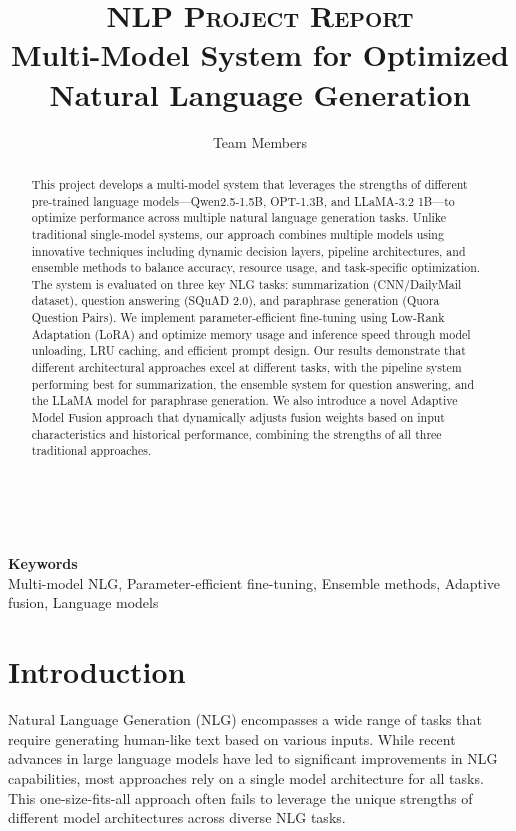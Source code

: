 \documentclass[10pt,twocolumn,letterpaper]{article}
\title{
    \usefont{OT1}{bch}{b}{n}
    \normalfont \normalsize \textsc{NLP Project Report} \\ [10pt]
    \huge Multi-Model System for Optimized Natural Language Generation \\
}
\author[1]{Team Members}
\affil[1]{\small{Department of Computer Science, IIT Delhi}}
\begin{document}
\maketitle

\begin{abstract}
This project develops a multi-model system that leverages the strengths of different pre-trained language models—Qwen2.5-1.5B, OPT-1.3B, and LLaMA-3.2 1B—to optimize performance across multiple natural language generation tasks. Unlike traditional single-model systems, our approach combines multiple models using innovative techniques including dynamic decision layers, pipeline architectures, and ensemble methods to balance accuracy, resource usage, and task-specific optimization. The system is evaluated on three key NLG tasks: summarization (CNN/DailyMail dataset), question answering (SQuAD 2.0), and paraphrase generation (Quora Question Pairs). We implement parameter-efficient fine-tuning using Low-Rank Adaptation (LoRA) and optimize memory usage and inference speed through model unloading, LRU caching, and efficient prompt design. Our results demonstrate that different architectural approaches excel at different tasks, with the pipeline system performing best for summarization, the ensemble system for question answering, and the LLaMA model for paraphrase generation. We also introduce a novel Adaptive Model Fusion approach that dynamically adjusts fusion weights based on input characteristics and historical performance, combining the strengths of all three traditional approaches.
\end{abstract} \\ 
\\ 
{\textbf{Keywords} \\
Multi-model NLG, Parameter-efficient fine-tuning, Ensemble methods, Adaptive fusion, Language models}

\section{Introduction}

Natural Language Generation (NLG) encompasses a wide range of tasks that require generating human-like text based on various inputs. While recent advances in large language models have led to significant improvements in NLG capabilities, most approaches rely on a single model architecture for all tasks. This one-size-fits-all approach often fails to leverage the unique strengths of different model architectures across diverse NLG tasks.
\end{document}

